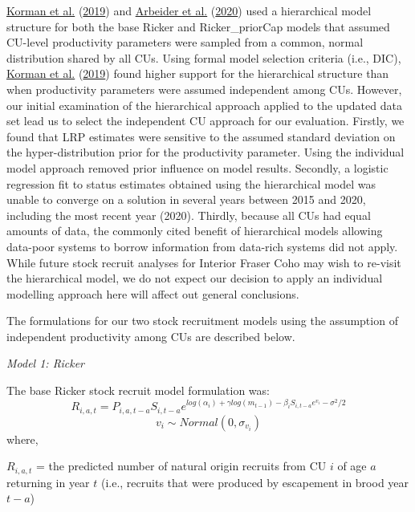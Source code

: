 \documentclass[11pt]{book}
\begin{document}
\protect\hyperlink{ref-kormanEvaluationFrameworkAssessing2019}{Korman et al.} (\protect\hyperlink{ref-kormanEvaluationFrameworkAssessing2019}{2019}) and \protect\hyperlink{ref-arbeiderInteriorFraserCoho2020}{Arbeider et al.} (\protect\hyperlink{ref-arbeiderInteriorFraserCoho2020}{2020}) used a hierarchical model structure for both the base Ricker and Ricker\_priorCap models that assumed CU-level productivity parameters were sampled from a common, normal distribution shared by all CUs. Using formal model selection criteria (i.e., DIC), \protect\hyperlink{ref-kormanEvaluationFrameworkAssessing2019}{Korman et al.} (\protect\hyperlink{ref-kormanEvaluationFrameworkAssessing2019}{2019}) found higher support for the hierarchical structure than when productivity parameters were assumed independent among CUs. However, our initial examination of the hierarchical approach applied to the updated data set lead us to select the independent CU approach for our evaluation. Firstly, we found that LRP estimates were sensitive to the assumed standard deviation on the hyper-distribution prior for the productivity parameter. Using the individual model approach removed prior influence on model results. Secondly, a logistic regression fit to status estimates obtained using the hierarchical model was unable to converge on a solution in several years between 2015 and 2020, including the most recent year (2020). Thirdly, because all CUs had equal amounts of data, the commonly cited benefit of hierarchical models allowing data-poor systems to borrow information from data-rich systems did not apply. While future stock recruit analyses for Interior Fraser Coho may wish to re-visit the hierarchical model, we do not expect our decision to apply an individual modelling approach here will affect out general conclusions.

The formulations for our two stock recruitment models using the assumption of independent productivity among CUs are described below.

\emph{Model 1: Ricker}

The base Ricker stock recruit model formulation was:
\begin{equation}
  R_{i,a,t} = P_{i,a,t-a}S_{i,t-a}e^{log(\alpha_i) + \gamma log(m_{t-1})-\beta_i S_{i,t-a}e^{v_i}-\sigma^2/2}
   \label{eq:rickerSurv-IM}
\end{equation} \begin{equation}
  v_i \sim Normal(0,\sigma_{v_i})
\end{equation}
where,

\(R_{i,a,t}\) = the predicted number of natural origin recruits from CU \(i\) of age \(a\) returning in year \(t\) (i.e., recruits that were produced by escapement in brood year \(t-a\))
\end{document}
